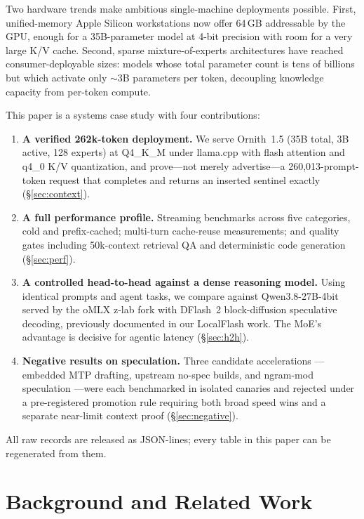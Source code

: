 \documentclass[11pt]{article}
\newcommand{\ornith}{Ornith~1.5}
\newcommand{\llamacpp}{llama.cpp}
\begin{document}
Two hardware trends make ambitious single-machine deployments possible.
First, unified-memory Apple Silicon workstations now offer 64\,GB addressable
by the GPU, enough for a 35B-parameter model at 4-bit precision with room for
a very large K/V cache. Second, sparse mixture-of-experts architectures have
reached consumer-deployable sizes: models whose total parameter count is tens
of billions but which activate only $\sim$3B parameters per token, decoupling
knowledge capacity from per-token compute.

This paper is a systems case study with four contributions:

\begin{enumerate}
\item \textbf{A verified 262k-token deployment.} We serve \ornith{}
(35B total, 3B active, 128 experts) at Q4\_K\_M under \llamacpp{} with flash
attention and q4\_0 K/V quantization, and prove---not merely advertise---a
260{,}013-prompt-token request that completes and returns an inserted sentinel
exactly (\S\ref{sec:context}).
\item \textbf{A full performance profile.} Streaming benchmarks across five
categories, cold and prefix-cached; multi-turn cache-reuse measurements; and
quality gates including 50k-context retrieval QA and deterministic code
generation (\S\ref{sec:perf}).
\item \textbf{A controlled head-to-head against a dense reasoning model.}
Using identical prompts and agent tasks, we compare against
Qwen3.8-27B-4bit served by the oMLX z-lab fork with DFlash~2 block-diffusion
speculative decoding, previously documented in our LocalFlash work. The MoE's
advantage is decisive for agentic latency (\S\ref{sec:h2h}).
\item \textbf{Negative results on speculation.} Three candidate accelerations
---embedded MTP drafting, upstream no-spec builds, and ngram-mod speculation
---were each benchmarked in isolated canaries and rejected under a
pre-registered promotion rule requiring both broad speed wins and a separate
near-limit context proof (\S\ref{sec:negative}).
\end{enumerate}

All raw records are released as JSON-lines; every table in this paper can be
regenerated from them.

\section{Background and Related Work}
\end{document}
